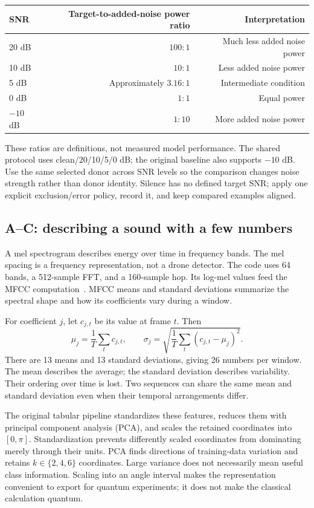 \documentclass[11pt,letterpaper]{article}
\begin{document}
\begin{center}
\begin{tabular}{@{}lrr@{}}
\toprule
SNR & Target-to-added-noise power ratio & Interpretation \\
\midrule
20 dB & $100:1$ & Much less added noise power \\
10 dB & $10:1$ & Less added noise power \\
5 dB & Approximately $3.16:1$ & Intermediate condition \\
0 dB & $1:1$ & Equal power \\
$-10$ dB & $1:10$ & More added noise power \\
\bottomrule
\end{tabular}
\end{center}
These ratios are definitions, not measured model performance. The shared
protocol uses clean/20/10/5/0 dB; the original baseline also supports $-10$ dB.
Use the same selected donor across SNR levels so the comparison changes noise
strength rather than donor identity. Silence has no defined target SNR; apply
one explicit exclusion/error policy, record it, and keep compared examples aligned.

\subsection{A--C: describing a sound with a few numbers}
A mel spectrogram describes energy over time in frequency bands. The mel
spacing is a frequency representation, not a drone detector. The code uses
64 bands, a 512-sample FFT, and a 160-sample hop. Its log-mel values feed the
MFCC computation~\cite{librosa}. MFCC means and standard deviations summarize
the spectral shape and how its coefficients vary during a window.

For coefficient $j$, let $c_{j,t}$ be its value at frame $t$. Then
\begin{equation}
 \mu_j=\frac{1}{T}\sum_t c_{j,t},\qquad
 \sigma_j=\sqrt{\frac{1}{T}\sum_t(c_{j,t}-\mu_j)^2}.
\end{equation}
There are 13 means and 13 standard deviations, giving 26 numbers per window.
The mean describes the average; the standard deviation describes variability.
Their ordering over time is lost. Two sequences can share the same mean and
standard deviation even when their temporal arrangements differ.

The original tabular pipeline standardizes these features, reduces them with
principal component analysis (PCA), and scales the retained coordinates into
$[0,\pi]$. Standardization prevents differently scaled coordinates from
dominating merely through their units. PCA finds directions of training-data
variation and retains $k\in\{2,4,6\}$ coordinates. Large variance does not
necessarily mean useful class information. Scaling into an angle interval
makes the representation convenient to export for quantum experiments; it does
not make the classical calculation quantum.
\end{document}
